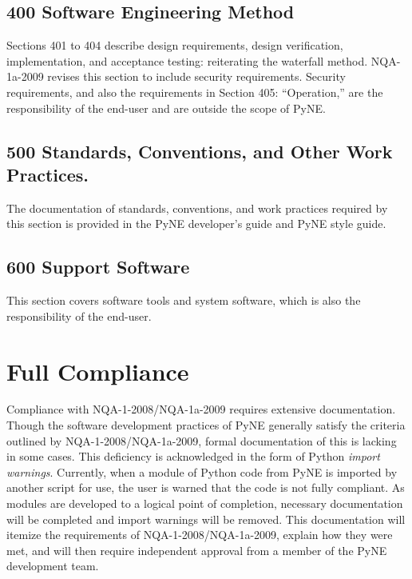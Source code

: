 \documentclass{anstrans}
\begin{document}


\subsection{400 Software Engineering Method}

Sections 401 to 404 describe design requirements, design
verification, implementation, and acceptance testing: reiterating the
waterfall method. NQA-1a-2009 revises this section to include security
requirements. Security requirements, and also the requirements in Section 405:
``Operation,'' are the responsibility of the end-user and are outside the scope of
PyNE.


\subsection{500 Standards, Conventions, and Other Work Practices.}

The documentation of standards, conventions, and work practices required by
this section is provided in the PyNE developer's guide and PyNE style guide.

\subsection{600 Support Software}
This section covers software tools and system software, which is also the responsibility of the end-user.

\section{Full Compliance}

Compliance with NQA-1-2008/NQA-1a-2009 requires extensive documentation.
Though the software development practices of PyNE generally satisfy the
criteria outlined by NQA-1-2008/NQA-1a-2009, formal documentation of this is
lacking in some cases. This deficiency is acknowledged in the form of Python \emph{import
warnings}. Currently, when a module of Python code from PyNE is imported by
another script for use, the user is warned that the code is not fully
compliant. As modules are developed to a logical point of completion, necessary
documentation will be completed and import warnings will be removed. 
This documentation will itemize the requirements of NQA-1-2008/NQA-1a-2009,
explain how they were met, and will then require independent approval from a
member of the PyNE development team.
\end{document}
